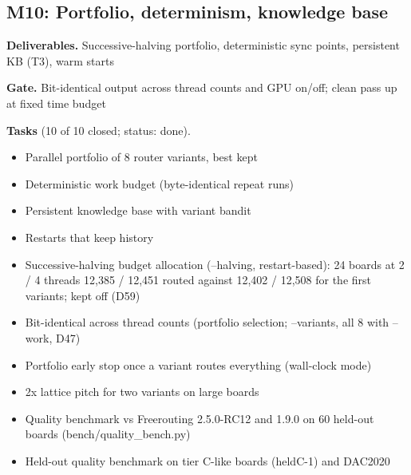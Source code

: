\subsection*{M10: Portfolio, determinism, knowledge base}
\noindent\textbf{Deliverables.} Successive-halving portfolio, deterministic sync points, persistent KB (T3), warm starts\par\smallskip
\noindent\textbf{Gate.} Bit-identical output across thread counts and GPU on/off; clean pass up at fixed time budget\par\smallskip
\noindent\textbf{Tasks} (10 of 10 closed; status: done).
\begin{itemize}[leftmargin=1.6em,itemsep=1pt]
\item[\textcolor{fraqua}{$\checkmark$}] Parallel portfolio of 8 router variants, best kept
\item[\textcolor{fraqua}{$\checkmark$}] Deterministic work budget (byte-identical repeat runs)
\item[\textcolor{fraqua}{$\checkmark$}] Persistent knowledge base with variant bandit
\item[\textcolor{fraqua}{$\checkmark$}] Restarts that keep history
\item[\textcolor{fraqua}{$\checkmark$}] Successive-halving budget allocation (--halving, restart-based): 24 boards at 2 / 4 threads 12,385 / 12,451 routed against 12,402 / 12,508 for the first variants; kept off (D59)
\item[\textcolor{fraqua}{$\checkmark$}] Bit-identical across thread counts (portfolio selection; --variants, all 8 with --work, D47)
\item[\textcolor{fraqua}{$\checkmark$}] Portfolio early stop once a variant routes everything (wall-clock mode)
\item[\textcolor{fraqua}{$\checkmark$}] 2x lattice pitch for two variants on large boards
\item[\textcolor{fraqua}{$\checkmark$}] Quality benchmark vs Freerouting 2.5.0-RC12 and 1.9.0 on 60 held-out boards (bench/quality\_bench.py)
\item[\textcolor{fraqua}{$\checkmark$}] Held-out quality benchmark on tier C-like boards (heldC-1) and DAC2020
\end{itemize}
